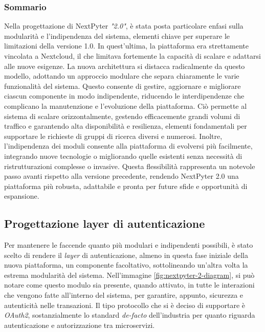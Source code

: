\subsubsection{Sommario}
Nella progettazione di NextPyter \textit{"2.0"}, è stata posta particolare enfasi sulla modularità e l'indipendenza del sistema, elementi chiave per superare le limitazioni della versione 1.0. In quest'ultima, la piattaforma era strettamente vincolata a Nextcloud, il che limitava fortemente la capacità di scalare e adattarsi alle nuove esigenze. La nuova architettura si distacca radicalmente da questo modello, adottando un approccio modulare che separa chiaramente le varie funzionalità del sistema. Questo consente di gestire, aggiornare e migliorare ciascun componente in modo indipendente, riducendo le interdipendenze che complicano la manutenzione e l'evoluzione della piattaforma. Ciò permette al sistema di scalare orizzontalmente, gestendo efficacemente grandi volumi di traffico e garantendo alta disponibilità e resilienza, elementi fondamentali per supportare le richieste di gruppi di ricerca diversi e numerosi. Inoltre, l'indipendenza dei moduli consente alla piattaforma di evolversi più facilmente, integrando nuove tecnologie o migliorando quelle esistenti senza necessità di ristrutturazioni complesse o invasive. Questa flessibilità rappresenta un notevole passo avanti rispetto alla versione precedente, rendendo NextPyter 2.0 una piattaforma più robusta, adattabile e pronta per future sfide e opportunità di espansione.

\subsection{Progettazione layer di autenticazione}
Per mantenere le faccende quanto più modulari e indipendenti possibili, è stato scelto di rendere il \textit{layer} di autenticazione, almeno in questa fase iniziale della nuova piattaforma, un componente facoltativo, sottolineando un'altra volta la estrema modularità del sistema.
\newline
Nell'immagine \ref{fig:nextpyter-2-diagram}, si può notare come questo modulo sia presente, quando attivato, in tutte le interazioni che vengono fatte all'interno del sistema, per garantire, appunto, sicurezza e autenticità nelle transazioni.
\newline
Il tipo protocollo che si è deciso di supportare è \textit{OAuth2}, sostanzialmente lo standard \textit{de-facto} \cite{auth0} dell'industria per quanto riguarda autenticazione e autorizzazione tra microservizi.
\newline
